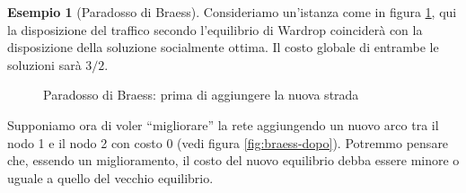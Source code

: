 \documentclass[a4paper]{article}
\newcounter{counter1}
\theoremstyle{plain}
\theoremstyle{definition}
\newtheorem{myes}[counter1]{Esempio}
\theoremstyle{remark}
\begin{document}
\begin{myes}[Paradosso di Braess{\cite[pag. 263]{braess1968}}]
\label{es:braess}
  Consideriamo un'istanza come in figura \ref{fig:braess-prima}, qui
  la disposizione del traffico secondo l'equilibrio di Wardrop
  coinciderà con la disposizione della soluzione socialmente
  ottima. Il costo globale di entrambe le soluzioni sarà $3/2$.
  \begin{figure}[ht]
    \centering
    \caption{Paradosso di Braess: prima di aggiungere la nuova strada}
    \label{fig:braess-prima}
  \end{figure}

  Supponiamo ora di voler ``migliorare'' la rete aggiungendo un nuovo
  arco tra il nodo 1 e il nodo 2 con costo $0$ (vedi figura
  \ref{fig:braess-dopo}). Potremmo pensare che, essendo un
  miglioramento, il costo del nuovo equilibrio debba essere minore o
  uguale a quello del vecchio equilibrio.


\end{myes}
\end{document}
